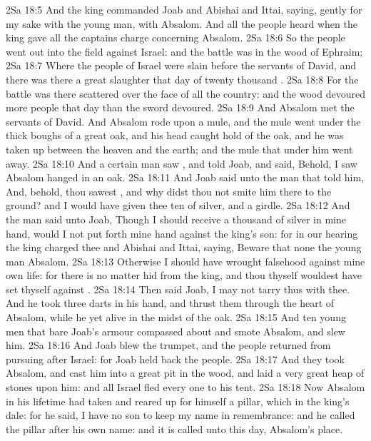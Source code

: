 \vs 2Sa 18:5 And the king commanded Joab and Abishai and Ittai, saying,  gently for my sake with the young man,  with Absalom. And all the people heard when the king gave all the captains charge concerning Absalom.
\vs 2Sa 18:6 So the people went out into the field against Israel: and the battle was in the wood of Ephraim;
\vs 2Sa 18:7 Where the people of Israel were slain before the servants of David, and there was there a great slaughter that day of twenty thousand .
\vs 2Sa 18:8 For the battle was there scattered over the face of all the country: and the wood devoured more people that day than the sword devoured.
\vs 2Sa 18:9 And Absalom met the servants of David. And Absalom rode upon a mule, and the mule went under the thick boughs of a great oak, and his head caught hold of the oak, and he was taken up between the heaven and the earth; and the mule that  under him went away.
\vs 2Sa 18:10 And a certain man saw , and told Joab, and said, Behold, I saw Absalom hanged in an oak.
\vs 2Sa 18:11 And Joab said unto the man that told him, And, behold, thou sawest , and why didst thou not smite him there to the ground? and I would have given thee ten  of silver, and a girdle.
\vs 2Sa 18:12 And the man said unto Joab, Though I should receive a thousand  of silver in mine hand,  would I not put forth mine hand against the king's son: for in our hearing the king charged thee and Abishai and Ittai, saying, Beware that none  the young man Absalom.
\vs 2Sa 18:13 Otherwise I should have wrought falsehood against mine own life: for there is no matter hid from the king, and thou thyself wouldest have set thyself against .
\vs 2Sa 18:14 Then said Joab, I may not tarry thus with thee. And he took three darts in his hand, and thrust them through the heart of Absalom, while he  yet alive in the midst of the oak.
\vs 2Sa 18:15 And ten young men that bare Joab's armour compassed about and smote Absalom, and slew him.
\vs 2Sa 18:16 And Joab blew the trumpet, and the people returned from pursuing after Israel: for Joab held back the people.
\vs 2Sa 18:17 And they took Absalom, and cast him into a great pit in the wood, and laid a very great heap of stones upon him: and all Israel fled every one to his tent.
\vs 2Sa 18:18 Now Absalom in his lifetime had taken and reared up for himself a pillar, which  in the king's dale: for he said, I have no son to keep my name in remembrance: and he called the pillar after his own name: and it is called unto this day, Absalom's place.
